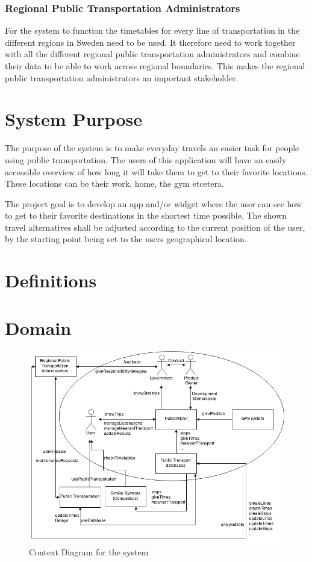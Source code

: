 \documentclass[a4paper]{article}
\begin{document}
			\subsubsection{Regional Public Transportation Administrators}
			For the system to function the timetables for every line of transportation in the different regions in Sweden need to be used. It therefore need to work together with all the different regional public transportation administrators and combine their data to be able to work across regional boundaries. This makes the regional public transportation administrators an important stakeholder.
	
	\section{System Purpose} %
	The purpose of the system is to make everyday travels an easier task for people using public transportation. The users of this application will have an easily accessible overview of how long it will take them to get to their favorite locations. These locations can be their work, home, the gym etcetera.
	
	
The project goal is to develop an app and/or widget where the user can see how to get to their favorite destinations in the shortest time possible. The shown travel alternatives shall be adjusted according to the current position of the user, by the starting point being set to the users geographical location.
	\section{Definitions}
		
	\section{Domain}
		\begin{figure}[H]
				\includegraphics[scale=0.50]{img/Context-v3.png}
			\caption{Context Diagram for the system}
		\end{figure}
		
\end{document}
